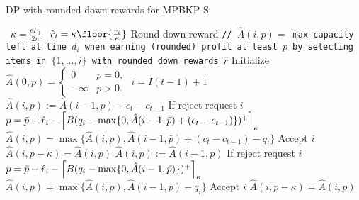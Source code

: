 \begin{algorithm}[h]
	\footnotesize
	\caption{DP with rounded down rewards for MPBKP-S}
	\label{alg:FPTAS_SC_1}
	\begin{algorithmic}[1]
		\Define \ $\kappa = \frac{\epsilon P_0 }{2n}$
		\Define \ $\hat{r}_i = \kappa \floor{ \frac{r_i}{\kappa} }$ \Comment Round down reward
		\Statex  \texttt{// $\hat{A}(i,p)=$ max capacity left at time $d_i$ when earning (rounded) profit at least $p$ by selecting items in $\{1,\ldots,i\}$ with rounded down rewards $\hat{r}$}
		\State Initialize $\hat{A}(0,p) = \begin{cases}
		0 & p = 0,\\
		-\infty & p > 0.
		\end{cases}$
		\State $i=I(t-1)+1$
		\State $\hat{A}(i,p) := \hat{A}(i-1,p)+c_{t}-c_{t-1}$ 
		\Comment If reject request $i$
		\EndFor
		\State $p = \bar{p} + \hat{r}_i - \left\lceil B(q_i -{\color{black}\max\{0,\hat{A}(i-1,\bar{p})+(c_{t}-c_{t-1})\}})^+\right\rceil_{\kappa}$
		\State $\hat{A}(i, p) = \max\{ \hat{A}(i,p ), \hat{A}(i-1,\bar{p}) + (c_{t}-c_{t-1}) - q_i \}$ \Comment Accept $i$
		\EndFor
		\vspace{0.1cm}
		\vspace{0.1cm}
		\State $\hat{A}(i,p-\kappa) = \hat{A}(i,p)$
		\EndIf
		\EndFor
		\State $\hat{A}(i,p) := \hat{A}(i-1, p)$ 
		\Comment If reject request $i$
		\EndFor
		\State ${p} = \bar{p} + \hat{r}_i - \left\lceil B(q_i - {\color{black}\max\{0, \hat{A}(i-1,\bar{p})\}})^+\right\rceil_{\kappa}$
		\State $\hat{A}(i, p) = \max\{ \hat{A}(i,p ), \hat{A}(i-1,\bar{p}) - q_i \}$ \Comment Accept $i$
		\EndFor
		\vspace{0.1cm}
		\vspace{0.1cm}
		\State $\hat{A}(i,p-\kappa) = \hat{A}(i,p)$
		\EndIf
		\EndFor
		\EndFor
		\EndFor
	\end{algorithmic}
\end{algorithm}
